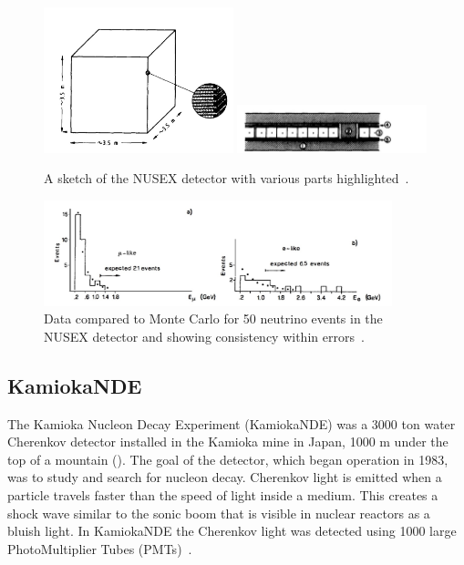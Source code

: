 \begin{figure}[h!]
\centering
  \centering
\includegraphics[width=0.49\textwidth]{figures/nusex1.jpeg}
\includegraphics[width=0.49\textwidth]{figures/nusex2.jpeg}
\vspace{2mm}
\caption{A sketch of the NUSEX detector with various parts highlighted~\cite{56NUSEX}.}
\label{fig:nusex}
\end{figure}

\begin{figure}[h!]
\centering
  \centering
\includegraphics[width=0.9\textwidth]{figures/nusexres.jpeg}
\vspace{2mm}
\caption{Data compared to Monte Carlo for 50 neutrino events in the NUSEX detector and showing consistency within errors~\cite{57NUSEX}.}
\label{fig:nusexres}
\end{figure}

\subsection{KamiokaNDE}
The Kamioka Nucleon Decay Experiment (KamiokaNDE) was a 3000 ton water Cherenkov detector installed in the Kamioka mine in Japan, 1000 m under the top of a mountain (). The goal of the detector, which began operation in 1983, was to study and search for nucleon decay. Cherenkov light is emitted when a particle travels faster than the speed of light inside a medium. This creates a shock wave similar to the sonic boom that is visible in nuclear reactors as a bluish light. In KamiokaNDE the Cherenkov light was detected using 1000 large PhotoMultiplier Tubes (PMTs)~\cite{58KAMIOKA}.


